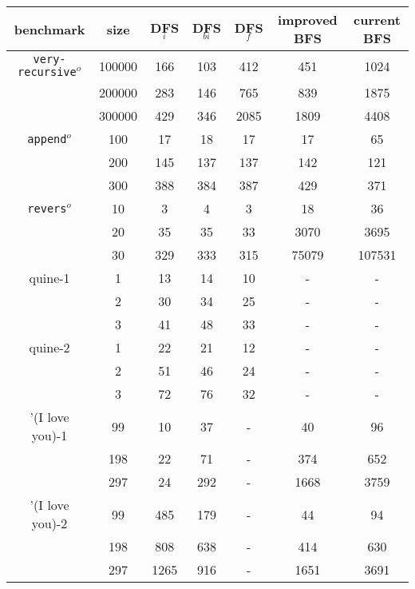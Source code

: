 \documentclass[format=acmlarge, review=true, authordraft=true]{acmart}
\newcommand{\veryrecursiveo}{\texttt{very-recursive$^o$}}
\newcommand{\appendo}{\texttt{append$^o$}}
\newcommand{\reverso}{\texttt{revers$^o$}}
\newcommand{\DFSi }[0]{DFS$_{i}$}
\newcommand{\DFSf }[0]{DFS$_{f}$}
\newcommand{\DFSbi}[0]{DFS$_{bi}$}
\newcommand{\BFSse}[0]{current BFS}
\newcommand{\BFSim}[0]{improved BFS}
\begin{document}
\begin{table}
	\begin{tabular}{|c|c|c|c|c|c|c|}
		\hline 
	benchmark & size & \DFSi & \DFSbi & \DFSf & \BFSim & \BFSse	\\
		\hline
		\veryrecursiveo & 100000 & 166 & 103 & 412 &   451 &   1024 \\
	    				& 200000 & 283 & 146 & 765 &   839 &   1875 \\
						& 300000 & 429 & 346 &2085 &  1809 &   4408 \\
		\hline  
		\appendo        & 	 100 &  17 &  18 &  17 &    17 &     65 \\
		         	  	& 	 200 & 145 & 137 & 137 &   142 &    121 \\
          		      	&	 300 & 388 & 384 & 387 &   429 &    371 \\
		\hline 
		\reverso		& 	  10 &   3 &   4 &   3 &    18 &     36 \\
						& 	  20 &  35 &  35 &  33 &  3070 &   3695 \\
						& 	  30 & 329 & 333 & 315 & 75079 & 107531 \\
		\hline
		quine-1 		& 1 & 13 & 14 & 10 & - & - \\
						& 2 & 30 & 34 & 25 & - & - \\
						& 3 & 41 & 48 & 33 & - & - \\
		\hline
		quine-2 		& 1 & 22 & 21 & 12 & - & - \\
						& 2 & 51 & 46 & 24 & - & - \\
						& 3 & 72 & 76 & 32 & - & - \\
		\hline
		'(I love you)-1 &  99 &  10 &  37 & - &   40 &   96 \\
						& 198 &  22 &  71 & - &  374 &  652 \\
						& 297 &  24 & 292 & - & 1668 & 3759 \\
		\hline
		'(I love you)-2 &  99 & 485 & 179 & - &   44 &   94 \\
						& 198 & 808 & 638 & - &  414 &  630 \\
						& 297 &1265 & 916 & - & 1651 & 3691 \\ 
		\hline 

\end{tabular}
\end{table}
\end{document}
